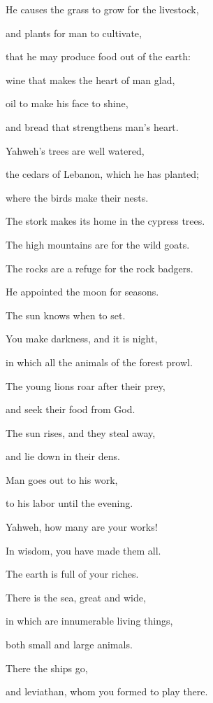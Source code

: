 {\par }{\Q {}He causes the grass to grow for the livestock,
\par }{\QB and plants for man to cultivate,
\par }{\QB that he may produce food out of the earth:
\par }{\Q {}wine that makes the heart of man glad,
\par }{\QB oil to make his face to shine,
\par }{\QB and bread that strengthens man’s heart.
\par }{\Q {}Yahweh’s trees are well watered,
\par }{\QB the cedars of Lebanon, which he has planted;
\par }{\Q {}where the birds make their nests.
\par }{\QB The stork makes its home in the cypress trees.
\par }{\Q {}The high mountains are for the wild goats.
\par }{\QB The rocks are a refuge for the rock badgers.
\par }{\Q {}He appointed the moon for seasons.
\par }{\QB The sun knows when to set.
\par }{\Q {}You make darkness, and it is night,
\par }{\QB in which all the animals of the forest prowl.
\par }{\Q {}The young lions roar after their prey,
\par }{\QB and seek their food from God.
\par }{\Q {}The sun rises, and they steal away,
\par }{\QB and lie down in their dens.
\par }{\Q {}Man goes out to his work,
\par }{\QB to his labor until the evening.
\par }{\Q {}Yahweh, how many are your works!
\par }{\QB In wisdom, you have made them all.
\par }{\QB The earth is full of your riches.
\par }{\Q {}There is the sea, great and wide,
\par }{\QB in which are innumerable living things,
\par }{\QB both small and large animals.
\par }{\Q {}There the ships go,
\par }{\QB and leviathan, whom you formed to play there.
}
